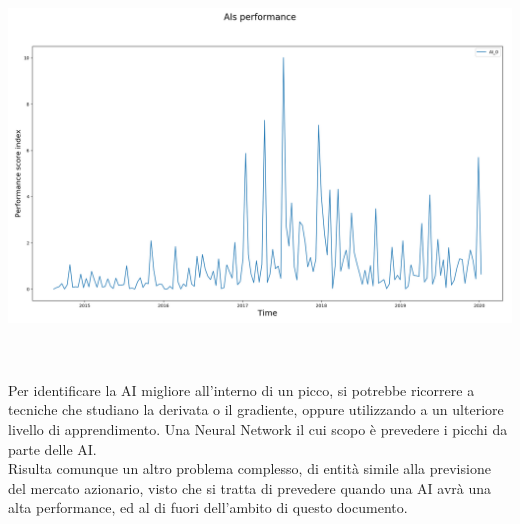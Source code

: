 \documentclass[a4paper,12pt]{report}
\begin{document}
\begin{fig}
\begin{fig}
	\begin{center}
		\includegraphics[width=\linewidth]{performance_metalearner}
	\end{center}
	\label{Figura 22}
\end{fig}
\\~\\Per identificare la AI migliore all'interno di un picco, si potrebbe ricorrere a tecniche che studiano la derivata o il gradiente, oppure utilizzando a un ulteriore livello di apprendimento. Una Neural Network il cui scopo è prevedere i picchi da parte delle AI.\\ Risulta comunque un altro problema complesso, di entità simile alla previsione del mercato azionario, visto che si tratta di prevedere quando una AI avrà una alta performance, ed al di fuori dell'ambito di questo documento.


\end{fig}
\end{document}
